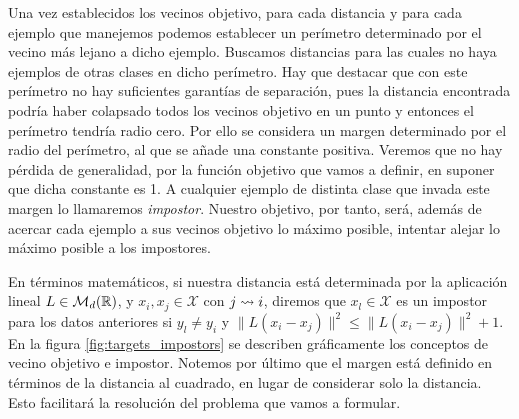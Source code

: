 Una vez establecidos los vecinos objetivo, para cada distancia y para cada ejemplo que manejemos podemos establecer un perímetro determinado por el vecino más lejano a dicho ejemplo. Buscamos distancias para las cuales no haya ejemplos de otras clases en dicho perímetro. Hay que destacar que con este perímetro no hay suficientes garantías de separación, pues la distancia encontrada podría haber colapsado todos los vecinos objetivo en un punto y entonces el perímetro tendría radio cero. Por ello se considera un margen determinado por el radio del perímetro, al que se añade una constante positiva. Veremos que no hay pérdida de generalidad, por la función objetivo que vamos a definir, en suponer que dicha constante es 1. A cualquier ejemplo de distinta clase que invada este margen lo llamaremos \emph{impostor}. Nuestro objetivo, por tanto, será, además de acercar cada ejemplo a sus vecinos objetivo lo máximo posible, intentar alejar lo máximo posible a los impostores.

En términos matemáticos, si nuestra distancia está determinada por la aplicación lineal $L \in \mathcal{M}_{d}(\mathbb{R})$, y $x_i, x_j \in \mathcal{X}$ con $j \rightsquigarrow i$, diremos que $x_l \in \mathcal{X}$ es un impostor para los datos anteriores si $y_l \ne y_i$ y $\|L(x_i - x_j)\|^2 \le \|L(x_i - x_j)\|^2+1$. En la figura \ref{fig:targets_impostors} se describen gráficamente los conceptos de vecino objetivo e impostor. Notemos por último que el margen está definido en términos de la distancia al cuadrado, en lugar de considerar solo la distancia. Esto facilitará la resolución del problema que vamos a formular.

